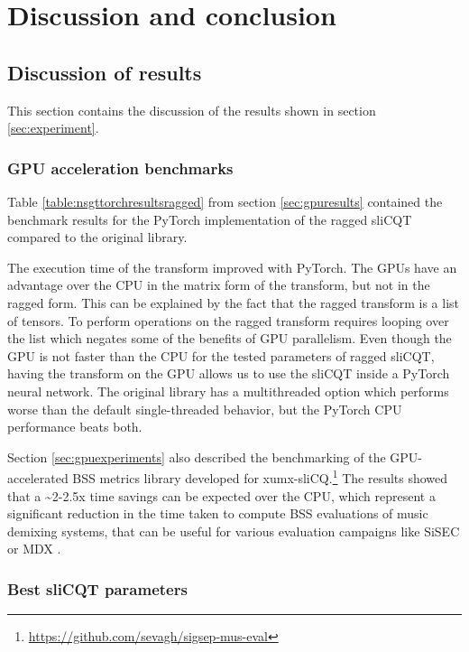 \documentclass[report.tex]{subfiles}
\begin{document}

\section{Discussion and conclusion}

\subsection{Discussion of results}
\label{sec:discussion}

This section contains the discussion of the results shown in section \ref{sec:experiment}.

\subsubsection{GPU acceleration benchmarks}

Table \ref{table:nsgttorchresultsragged} from section \ref{sec:gpuresults} contained the benchmark results for the PyTorch implementation of the ragged sliCQT compared to the original library.

The execution time of the transform improved with PyTorch. The GPUs have an advantage over the CPU in the matrix form of the transform, but not in the ragged form. This can be explained by the fact that the ragged transform is a list of tensors. To perform operations on the ragged transform requires looping over the list which negates some of the benefits of GPU parallelism. Even though the GPU is not faster than the CPU for the tested parameters of ragged sliCQT, having the transform on the GPU allows us to use the sliCQT inside a PyTorch neural network. The original library has a multithreaded option which performs worse than the default single-threaded behavior, but the PyTorch CPU performance beats both.

Section \ref{sec:gpuexperiments} also described the benchmarking of the GPU-accelerated BSS metrics library developed for xumx-sliCQ.\footnote{\url{https://github.com/sevagh/sigsep-mus-eval}} The results showed that a \textasciitilde2-2.5x time savings can be expected over the CPU, which represent a significant reduction in the time taken to compute BSS evaluations of music demixing systems, that can be useful for various evaluation campaigns like SiSEC \parencite{sisec2018} or MDX \parencite{mdx21}.

\subsubsection{Best sliCQT parameters}
\end{document}
